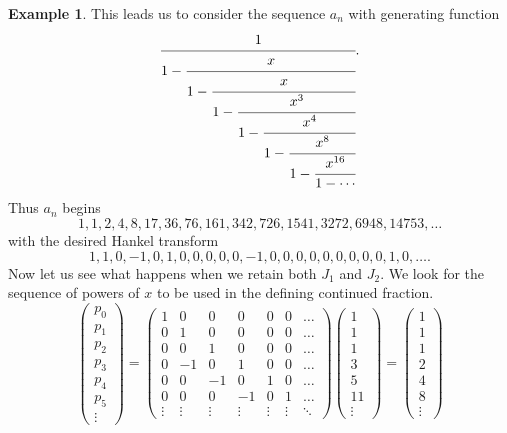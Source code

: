 \documentclass[12pt,reqno]{article}
\theoremstyle{definition}
\newtheorem{example}[theorem]{Example}
\begin{document}
\begin{example}
This leads us to consider the sequence $a_n$ with generating function
$$\cfrac{1}{1-
\cfrac{x}{1-
\cfrac{x}{1-
\cfrac{x^3}{1-
\cfrac{x^4}{1-
\cfrac{x^8}{1-
\cfrac{x^{16}}{1-\cdots}}}}}}}.$$
Thus $a_n$ begins
$$1, 1, 2, 4, 8, 17, 36, 76, 161, 342, 726, 1541, 3272, 6948, 14753,  \ldots$$ with the desired Hankel transform
$$1, 1, 0, -1, 0, 1, 0, 0, 0, 0, 0, -1, 0, 0, 0, 0, 0, 0, 0, 0, 0, 1, 0,\ldots.$$
Now let us see what happens when we retain both $J_1$ and $J_2$.
We look for the sequence of powers of $x$ to be used in the defining continued fraction.
\begin{displaymath}\left(\begin{array}{c} p_0 \\ p_1 \\p_2\\ p_3 \\p_4 \\p_5 \\ \vdots \end{array}\right)=
\left(\begin{array}{ccccccc}1 & 0 & 0 & 0 & 0 & 0 & \ldots \\
                            0 & 1 & 0 & 0 & 0 & 0 & \ldots \\
                            0 & 0 & 1 & 0& 0 & 0 & \ldots \\
                            0 & -1 & 0 & 1 & 0 & 0 & \ldots \\
                            0 & 0 & -1&  0 & 1 & 0 & \ldots \\
                            0 & 0  & 0 & -1 & 0 & 1 &\ldots\\ \vdots
& \vdots &
\vdots & \vdots & \vdots & \vdots &
\ddots\end{array}\right)\left(\begin{array}{c} 1 \\ 1 \\1\\ 3 \\5 \\11 \\ \vdots \end{array}\right)=
\left(\begin{array}{c} 1 \\ 1 \\1\\ 2 \\4 \\8 \\ \vdots \end{array}\right)\end{displaymath}


\end{example}
\end{document}
